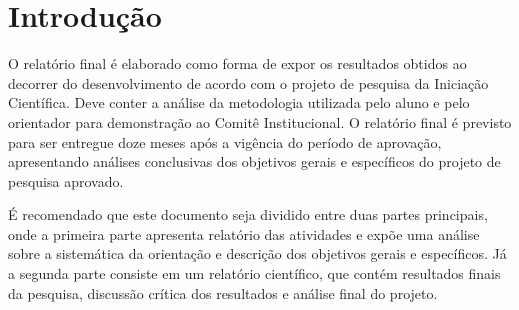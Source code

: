 \chapter{Introdução}

O relatório final é elaborado como forma de expor os resultados obtidos ao decorrer do desenvolvimento de acordo com o projeto de pesquisa da Iniciação Científica. Deve conter a análise da metodologia utilizada pelo aluno e pelo orientador para demonstração ao Comitê Institucional. O relatório final é previsto para ser entregue doze meses após a vigência do período de aprovação, apresentando análises conclusivas dos objetivos gerais e específicos do projeto de pesquisa aprovado.

É recomendado que este documento seja dividido entre duas partes principais, onde a primeira parte apresenta relatório das atividades e expõe uma análise sobre a sistemática da orientação e descrição dos objetivos gerais e específicos. Já a segunda parte consiste em um relatório científico, que contém resultados finais da pesquisa, discussão crítica dos resultados e análise final do projeto.